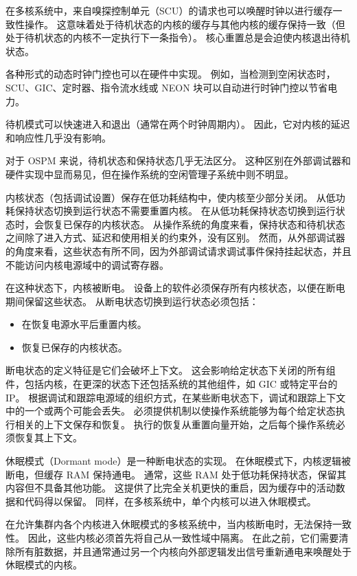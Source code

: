 在多核系统中，来自嗅探控制单元（SCU）的请求也可以唤醒时钟以进行缓存一致性操作。
这意味着处于待机状态的内核的缓存与其他内核的缓存保持一致（但处于待机状态的内核不一定执行下一条指令）。
核心重置总是会迫使内核退出待机状态。

各种形式的动态时钟门控也可以在硬件中实现。
例如，当检测到空闲状态时，SCU、GIC、定时器、指令流水线或
NEON 块可以自动进行时钟门控以节省电力。

待机模式可以快速进入和退出（通常在两个时钟周期内）。
因此，它对内核的延迟和响应性几乎没有影响。

对于 OSPM 来说，待机状态和保持状态几乎无法区分。
这种区别在外部调试器和硬件实现中显而易见，但在操作系统的空闲管理子系统中则不明显。


内核状态（包括调试设置）保存在低功耗结构中，使内核至少部分关闭。
从低功耗保持状态切换到运行状态不需要重置内核。
在从低功耗保持状态切换到运行状态时，会恢复已保存的内核状态。
从操作系统的角度来看，保持状态和待机状态之间除了进入方式、延迟和使用相关的约束外，没有区别。
然而，从外部调试器的角度来看，这些状态有所不同，因为外部调试请求调试事件保持挂起状态，并且不能访问内核电源域中的调试寄存器。


在这种状态下，内核被断电。
设备上的软件必须保存所有内核状态，以便在断电期间保留这些状态。
从断电状态切换到运行状态必须包括：

\begin{itemize}
\item
  在恢复电源水平后重置内核。
\item
  恢复已保存的内核状态。
\end{itemize}

断电状态的定义特征是它们会破坏上下文。
这会影响给定状态下关闭的所有组件，包括内核，在更深的状态下还包括系统的其他组件，如 GIC 或特定平台的 IP。
根据调试和跟踪电源域的组织方式，在某些断电状态下，调试和跟踪上下文中的一个或两个可能会丢失。
必须提供机制以使操作系统能够为每个给定状态执行相关的上下文保存和恢复。
执行的恢复从重置向量开始，之后每个操作系统必须恢复其上下文。


休眠模式（Dormant mode）是一种断电状态的实现。
在休眠模式下，内核逻辑被断电，但缓存 RAM 保持通电。
通常，这些 RAM 处于低功耗保持状态，保留其内容但不具备其他功能。
这提供了比完全关机更快的重启，因为缓存中的活动数据和代码得以保留。
同样，在多核系统中，单个内核可以进入休眠模式。

在允许集群内各个内核进入休眠模式的多核系统中，当内核断电时，无法保持一致性。
因此，这些内核必须首先将自己从一致性域中隔离。
在此之前，它们需要清除所有脏数据，并且通常通过另一个内核向外部逻辑发出信号重新通电来唤醒处于休眠模式的内核。

